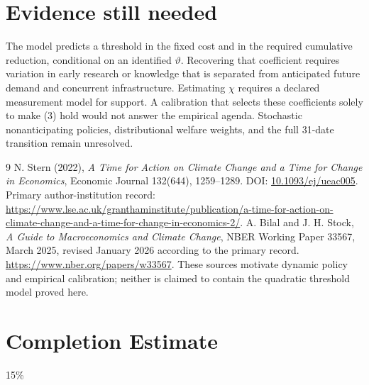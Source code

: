 \documentclass[11pt,a4paper]{article}
\theoremstyle{remark}
\begin{document}
\section{Evidence still needed}
The model predicts a threshold in the fixed cost and in the required cumulative reduction, conditional on an identified $\vartheta$. Recovering that coefficient requires variation in early research or knowledge that is separated from anticipated future demand and concurrent infrastructure. Estimating $\chi$ requires a declared measurement model for support. A calibration that selects these coefficients solely to make (3) hold would not answer the empirical agenda. Stochastic nonanticipating policies, distributional welfare weights, and the full 31-date transition remain unresolved.

\begin{thebibliography}{9}
 N. Stern (2022), \emph{A Time for Action on Climate Change and a Time for Change in Economics}, Economic Journal 132(644), 1259--1289. DOI: \href{https://doi.org/10.1093/ej/ueac005}{10.1093/ej/ueac005}. Primary author-institution record: \url{https://www.lse.ac.uk/granthaminstitute/publication/a-time-for-action-on-climate-change-and-a-time-for-change-in-economics-2/}.
 A. Bilal and J. H. Stock, \emph{A Guide to Macroeconomics and Climate Change}, NBER Working Paper 33567, March 2025, revised January 2026 according to the primary record. \url{https://www.nber.org/papers/w33567}. These sources motivate dynamic policy and empirical calibration; neither is claimed to contain the quadratic threshold model proved here.
\end{thebibliography}

\section{Completion Estimate}
15\%
\end{document}
